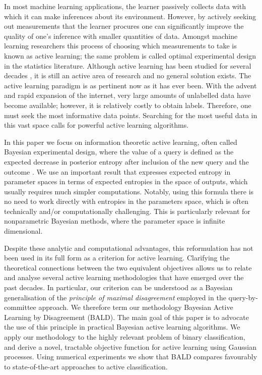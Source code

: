 \documentclass[twoside]{article}
\begin{document}
In most machine learning applications, the learner passively collects data with which it can make inferences about its environment. However, by actively seeking out measurements that the learner procures one can significantly improve the quality of one's inference with smaller quantities of data. Amongst machine learning researchers this process of choosing which measurements to take is known as active learning; the same problem is called optimal experimental design in the statistics literature. Although active learning has been studied for several decades \cite{lindley1956,jaynes1986}, it is still an active area of research and no general solution exists. The active learning paradigm is as pertinent now as it has ever been. With the advent and rapid expansion of the internet, very large amounts of unlabelled data have become available; however, it is relatively costly to obtain labels. Therefore, one must seek the most informative data points. Searching for the most useful data in this vast space calls for powerful active learning algorithms.

In this paper we focus on information theoretic active learning, often called Bayesian experimental design, where the value of a query is defined as the expected decrease in posterior entropy after inclusion of the new query and the outcome \cite{MacKay1992}. We use an important result that expresses expected entropy in parameter spaces in terms of expected entropies in the space of outputs, which usually requires much simpler computations. Notably, using this formula there is no need to work directly with entropies in the parameters space, which is often technically and/or computationally challenging. This is particularly relevant for nonparametric Bayesian methods, where the parameter space is infinite dimensional.

Despite these analytic and computational advantages, this reformulation has not been used in its full form as a criterion for active learning. Clarifying the theoretical connections between the two equivalent objectives allows us to relate and analyse several active learning methodologies that have emerged over the past decades. In particular, our criterion can be understood as a Bayesian generalisation of the \emph{principle of maximal disagreement} employed in the query-by-committee approach. We therefore term our methodology Bayesian Active Learning by Disagreement (BALD). The main goal of this paper is to advocate the use of this principle in practical Bayesian active learning algorithms. We apply our methodology to the highly relevant problem of binary classification, and derive a novel, tractable objective function for active learning using Gaussian processes. Using numerical experiments we show that BALD  compares favourably to state-of-the-art approaches to active classification.
\end{document}
